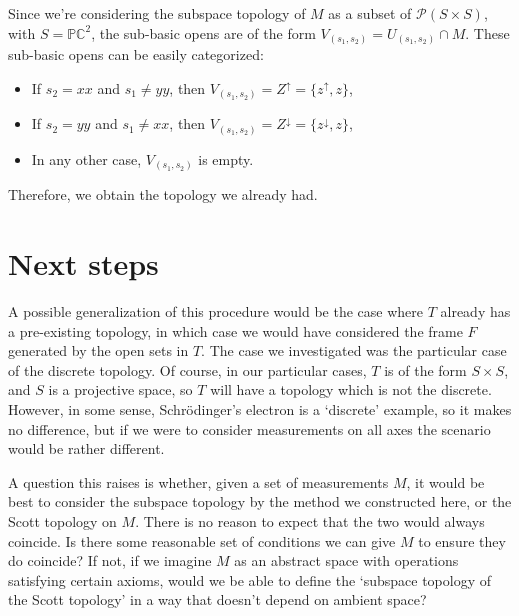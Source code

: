 \documentclass{article}
\theoremstyle{definition}
\theoremstyle{plain}
\newcommand{\C}{\mathbb{C}}
\newcommand{\ps}{\mathcal{P}}
\newcommand{\pr}{\mathbb{P}}
\begin{document}
Since we're considering the subspace topology of $M$ as a subset of $\ps(S \times S)$, with $S = \pr \C^2$, the sub-basic opens are of the form $V_{(s_1,s_2)} = U_{(s_1,s_2)} \cap M$. These sub-basic opens can be easily categorized:
\begin{itemize}
\item If $s_2 = xx$ and $s_1 \neq yy$, then $V_{(s_1,s_2)} = Z^\uparrow = \{z^\uparrow, z\}$,
\item If $s_2 = yy$ and $s_1 \neq xx$, then $V_{(s_1,s_2)} = Z^\downarrow = \{z^\downarrow, z\}$,
\item In any other case, $V_{(s_1,s_2)}$ is empty.
\end{itemize}

Therefore, we obtain the topology we already had.

\section{Next steps}

A possible generalization of this procedure would be the case where $T$ already has a pre-existing topology, in which case we would have considered the frame $F$ generated by the open sets in $T$. The case we investigated was the particular case of the discrete topology. Of course, in our particular cases, $T$ is of the form $S \times S$, and $S$ is a projective space, so $T$ will have a topology which is not the discrete. However, in some sense, Schrödinger's electron is a `discrete' example, so it makes no difference, but if we were to consider measurements on all axes the scenario would be rather different.

A question this raises is whether, given a set of measurements $M$, it would be best to consider the subspace topology by the method we constructed here, or the Scott topology on $M$. There is no reason to expect that the two would always coincide. Is there some reasonable set of conditions we can give $M$ to ensure they do coincide? If not, if we imagine $M$ as an abstract space with operations satisfying certain axioms, would we be able to define the `subspace topology of the Scott topology' in a way that doesn't depend on ambient space?

{}

\end{document}
